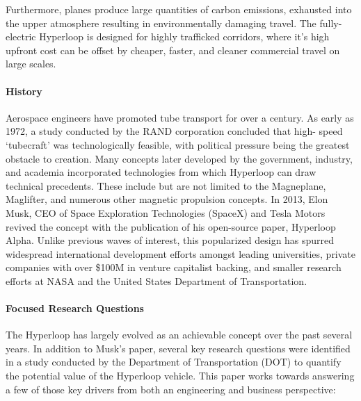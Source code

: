 	Furthermore, planes produce large quantities of carbon emissions,
	exhausted into the upper atmosphere resulting in environmentally damaging travel.
	The fully-electric Hyperloop is designed for highly trafficked corridors,
	where it's high upfront cost can be offset by cheaper, faster, and cleaner
	commercial travel on large scales.\\

\paragraph{History}

	Aerospace engineers have promoted tube transport for over a century.
	As early as 1972, a study conducted by the RAND corporation concluded that high-
	speed `tubecraft' was technologically feasible, with political pressure being the greatest
	obstacle to creation.\cite{RAND} Many concepts later developed by
	the government, industry, and academia incorporated technologies from which
	Hyperloop can draw technical precedents.
	These include but are not limited to the Magneplane, Maglifter, and numerous
	other magnetic propulsion concepts. In 2013, Elon Musk, CEO of Space Exploration
	Technologies (SpaceX) and Tesla Motors revived the concept with the publication
	of his open-source paper, Hyperloop Alpha.\cite{Musk}
	Unlike previous waves of interest, this popularized design has spurred widespread international
	development efforts amongst leading universities, private companies with over
	\$100M in venture capitalist backing, and smaller research efforts at NASA and the
	United States Department of Transportation. \cite{Chin}

\paragraph{Focused Research Questions}

	The Hyperloop has largely evolved as an achievable concept over the past several years.
	In addition to Musk's paper, several key research questions were identified in a study conducted
	by the Department of Transportation (DOT) to quantify the potential value of the
	Hyperloop vehicle. \cite{Volpe} This paper works towards answering a few of
	those key drivers from both an engineering and business perspective:\\


